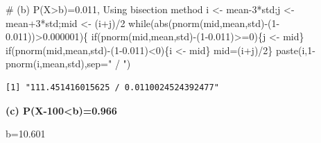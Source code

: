 \documentclass[
  letterpaper,
  DIV=11,
  numbers=noendperiod]{scrreprt}
\newenvironment{Shaded}{\begin{snugshade}}{\end{snugshade}}
\newcommand{\AttributeTok}[1]{\textcolor[rgb]{0.40,0.45,0.13}{#1}}
\newcommand{\CommentTok}[1]{\textcolor[rgb]{0.37,0.37,0.37}{#1}}
\newcommand{\ControlFlowTok}[1]{\textcolor[rgb]{0.00,0.23,0.31}{#1}}
\newcommand{\DecValTok}[1]{\textcolor[rgb]{0.68,0.00,0.00}{#1}}
\newcommand{\FloatTok}[1]{\textcolor[rgb]{0.68,0.00,0.00}{#1}}
\newcommand{\FunctionTok}[1]{\textcolor[rgb]{0.28,0.35,0.67}{#1}}
\newcommand{\NormalTok}[1]{\textcolor[rgb]{0.00,0.23,0.31}{#1}}
\newcommand{\OtherTok}[1]{\textcolor[rgb]{0.00,0.23,0.31}{#1}}
\newcommand{\SpecialCharTok}[1]{\textcolor[rgb]{0.37,0.37,0.37}{#1}}
\newcommand{\StringTok}[1]{\textcolor[rgb]{0.13,0.47,0.30}{#1}}
\begin{document}
\begin{Shaded}
\begin{Highlighting}[]
\CommentTok{\# (b) P(X\textgreater{}b)=0.011, Using bisection method}
\NormalTok{i }\OtherTok{\textless{}{-}}\NormalTok{ mean}\DecValTok{{-}3}\SpecialCharTok{*}\NormalTok{std;j }\OtherTok{\textless{}{-}}\NormalTok{ mean}\SpecialCharTok{+}\DecValTok{3}\SpecialCharTok{*}\NormalTok{std;mid }\OtherTok{\textless{}{-}}\NormalTok{ (i}\SpecialCharTok{+}\NormalTok{j)}\SpecialCharTok{/}\DecValTok{2}
\ControlFlowTok{while}\NormalTok{(}\FunctionTok{abs}\NormalTok{(}\FunctionTok{pnorm}\NormalTok{(mid,mean,std)}\SpecialCharTok{{-}}\NormalTok{(}\DecValTok{1}\FloatTok{{-}0.011}\NormalTok{))}\SpecialCharTok{\textgreater{}}\FloatTok{0.000001}\NormalTok{)\{}
  \ControlFlowTok{if}\NormalTok{(}\FunctionTok{pnorm}\NormalTok{(mid,mean,std)}\SpecialCharTok{{-}}\NormalTok{(}\DecValTok{1}\FloatTok{{-}0.011}\NormalTok{)}\SpecialCharTok{\textgreater{}=}\DecValTok{0}\NormalTok{)\{j }\OtherTok{\textless{}{-}}\NormalTok{ mid\}}
  \ControlFlowTok{if}\NormalTok{(}\FunctionTok{pnorm}\NormalTok{(mid,mean,std)}\SpecialCharTok{{-}}\NormalTok{(}\DecValTok{1}\FloatTok{{-}0.011}\NormalTok{)}\SpecialCharTok{\textless{}}\DecValTok{0}\NormalTok{)\{i }\OtherTok{\textless{}{-}}\NormalTok{ mid\}}
\NormalTok{  mid}\OtherTok{=}\NormalTok{(i}\SpecialCharTok{+}\NormalTok{j)}\SpecialCharTok{/}\DecValTok{2}\NormalTok{\}}
\FunctionTok{paste}\NormalTok{(i,}\DecValTok{1}\SpecialCharTok{{-}}\FunctionTok{pnorm}\NormalTok{(i,mean,std),}\AttributeTok{sep=}\StringTok{" / "}\NormalTok{)}
\end{Highlighting}
\end{Shaded}

\begin{verbatim}
[1] "111.451416015625 / 0.0110024524392477"
\end{verbatim}

\textbf{(c) P(\textbar X-100\textbar\textless b)=0.966}

b=10.601
\end{document}
